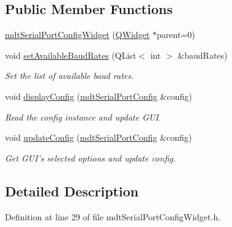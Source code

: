 \subsection*{Public Member Functions}
\begin{DoxyCompactItemize}
\item 
\hyperlink{classmdt_serial_port_config_widget_a7c6dc14693263f011e0725d45040b0f3}{mdt\-Serial\-Port\-Config\-Widget} (\hyperlink{class_q_widget}{Q\-Widget} $\ast$parent=0)
\item 
void \hyperlink{classmdt_serial_port_config_widget_a5113611573e0e8cc0fd030e887e17c86}{set\-Available\-Baud\-Rates} (Q\-List$<$ int $>$ \&baud\-Rates)
\begin{DoxyCompactList}\small\item\em Set the list of available baud rates. \end{DoxyCompactList}\item 
void \hyperlink{classmdt_serial_port_config_widget_a3cc8a728e224b656510896f31047fb73}{display\-Config} (\hyperlink{classmdt_serial_port_config}{mdt\-Serial\-Port\-Config} \&config)
\begin{DoxyCompactList}\small\item\em Read the config instance and update G\-U\-I. \end{DoxyCompactList}\item 
void \hyperlink{classmdt_serial_port_config_widget_aebc1fba656f51f9910a466add7987fcf}{update\-Config} (\hyperlink{classmdt_serial_port_config}{mdt\-Serial\-Port\-Config} \&config)
\begin{DoxyCompactList}\small\item\em Get G\-U\-I's selected options and update config. \end{DoxyCompactList}\end{DoxyCompactItemize}


\subsection{Detailed Description}


Definition at line 29 of file mdt\-Serial\-Port\-Config\-Widget.\-h.



